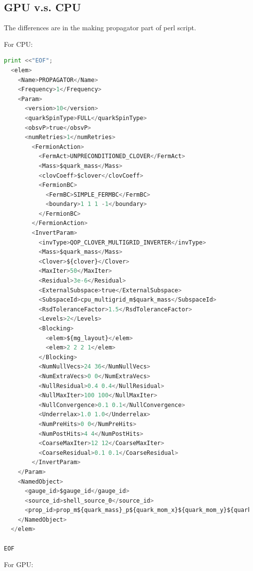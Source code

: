 \documentclass{article}
\begin{document}
\subsection{GPU v.s. CPU}

The differences are in the making propagator part of perl script.

For CPU:

\begin{lstlisting}[language=Python]
  print <<"EOF";
  <elem>
    <Name>PROPAGATOR</Name>
    <Frequency>1</Frequency>
    <Param>
      <version>10</version>
      <quarkSpinType>FULL</quarkSpinType>
      <obsvP>true</obsvP>
      <numRetries>1</numRetries>
        <FermionAction>
          <FermAct>UNPRECONDITIONED_CLOVER</FermAct>
          <Mass>$quark_mass</Mass>
          <clovCoeff>$clover</clovCoeff>
          <FermionBC>
            <FermBC>SIMPLE_FERMBC</FermBC>
            <boundary>1 1 1 -1</boundary>
          </FermionBC>
        </FermionAction>
        <InvertParam>
          <invType>QOP_CLOVER_MULTIGRID_INVERTER</invType>
          <Mass>$quark_mass</Mass>
          <Clover>${clover}</Clover>
          <MaxIter>50</MaxIter>
          <Residual>3e-6</Residual>
          <ExternalSubspace>true</ExternalSubspace>
          <SubspaceId>cpu_multigrid_m$quark_mass</SubspaceId>
          <RsdToleranceFactor>1.5</RsdToleranceFactor>
          <Levels>2</Levels>
          <Blocking>
            <elem>${mg_layout}</elem>
            <elem>2 2 2 1</elem>
          </Blocking>
          <NumNullVecs>24 36</NumNullVecs>
          <NumExtraVecs>0 0</NumExtraVecs>
          <NullResidual>0.4 0.4</NullResidual>
          <NullMaxIter>100 100</NullMaxIter>
          <NullConvergence>0.1 0.1</NullConvergence>
          <Underrelax>1.0 1.0</Underrelax>
          <NumPreHits>0 0</NumPreHits>
          <NumPostHits>4 4</NumPostHits>
          <CoarseMaxIter>12 12</CoarseMaxIter>
          <CoarseResidual>0.1 0.1</CoarseResidual>
        </InvertParam>
    </Param>
    <NamedObject>
      <gauge_id>$gauge_id</gauge_id>
      <source_id>shell_source_0</source_id>
      <prop_id>prop_m${quark_mass}_p${quark_mom_x}${quark_mom_y}${quark_mom_z}.src0</prop_id>
    </NamedObject>
  </elem>

EOF
\end{lstlisting}


For GPU:
\end{document}
